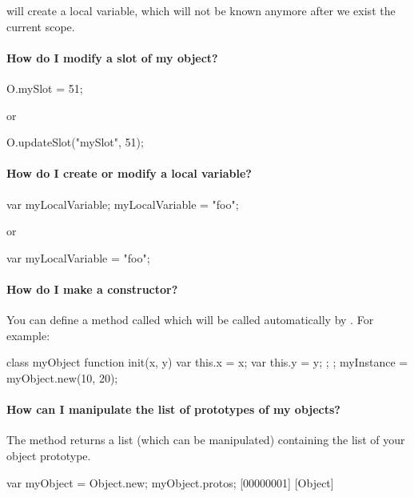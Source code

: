 \noindent
will create a local variable, which will not be known anymore after we
exist the current scope.

\paragraph{How do I modify a slot of my object?}
\begin{urbifixme}
O.mySlot = 51;
\end{urbifixme}

\noindent
or

\begin{urbifixme}
O.updateSlot("mySlot", 51);
\end{urbifixme}

\paragraph{How do I create or modify a local variable?}
\begin{urbifixme}
var myLocalVariable;
myLocalVariable = "foo";
\end{urbifixme}

\noindent
or

\begin{urbifixme}
var myLocalVariable = "foo";
\end{urbifixme}


\paragraph{How do I make a constructor?}
You can define a method called  which will be called
automatically by . For example:

\begin{urbifixme}
class myObject {
  function init(x, y) {
    var this.x = x;
    var this.y = y;
  };
};
myInstance = myObject.new(10, 20);
\end{urbifixme}


\paragraph{How can I manipulate the list of prototypes of my objects?}
The  method returns a list (which can be manipulated)
containing the list of your object prototype.

\begin{urbifixme}
var myObject = Object.new;
myObject.protos;
[00000001] [Object]
\end{urbifixme}

